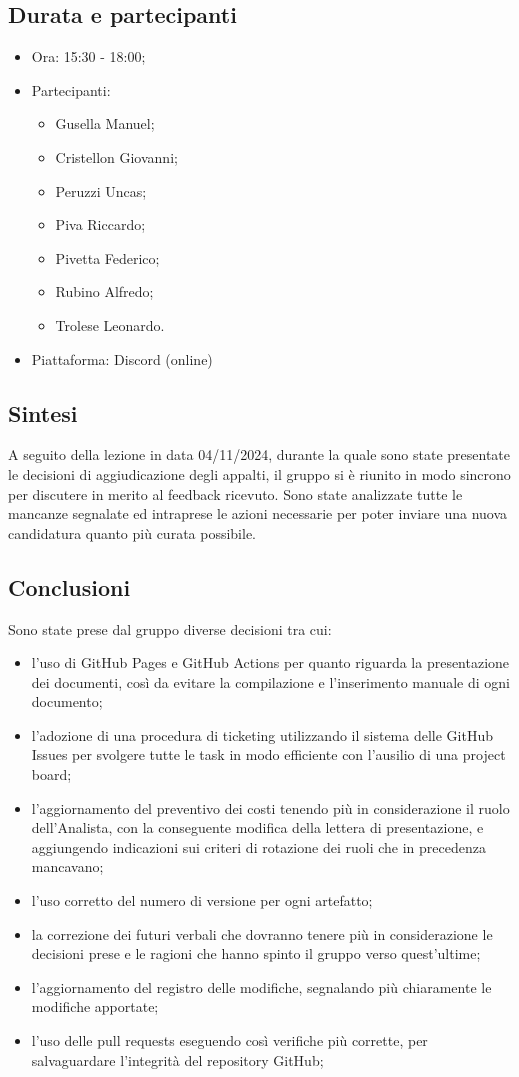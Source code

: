 \documentclass[12pt]{article}
\begin{document}
\subsection{Durata e partecipanti}
\begin{itemize}
\item Ora: 15:30 - 18:00;
\item Partecipanti: 	
	\begin{itemize}
	\item Gusella Manuel;
	\item Cristellon Giovanni;
	\item Peruzzi Uncas;
	\item Piva Riccardo;
	\item Pivetta Federico;
	\item Rubino Alfredo;
	\item Trolese Leonardo.
	\end{itemize}
\item Piattaforma: Discord (online)
\end{itemize}
\subsection{Sintesi}
A seguito della lezione in data 04/11/2024, durante la quale sono state presentate le decisioni di aggiudicazione degli appalti, il gruppo si è riunito in modo sincrono per discutere in merito al feedback ricevuto. Sono state analizzate tutte le mancanze segnalate ed intraprese le azioni necessarie per poter inviare una nuova candidatura quanto più curata possibile.
\subsection{Conclusioni}
Sono state prese dal gruppo diverse decisioni tra cui:
\begin{itemize}
\item l'uso di GitHub Pages e GitHub Actions per quanto riguarda la presentazione dei documenti, così da evitare la compilazione e l'inserimento manuale di ogni documento;
\item l'adozione di una procedura di ticketing utilizzando il sistema delle GitHub Issues per svolgere tutte le task in modo efficiente con l'ausilio di una project board;
\item l'aggiornamento del preventivo dei costi tenendo più in considerazione il ruolo dell'Analista, con la conseguente modifica della lettera di presentazione, e aggiungendo indicazioni sui criteri di rotazione dei ruoli che in precedenza mancavano;
\item l'uso corretto del numero di versione per ogni artefatto;
\item la correzione dei futuri verbali che dovranno tenere più in considerazione le decisioni prese e le ragioni che hanno spinto il gruppo verso quest'ultime; 
\item l'aggiornamento del registro delle modifiche, segnalando più chiaramente le modifiche apportate;
\item l'uso delle pull requests eseguendo così verifiche più corrette, per salvaguardare l'integrità del repository GitHub;
\end{itemize}
\end{document}
